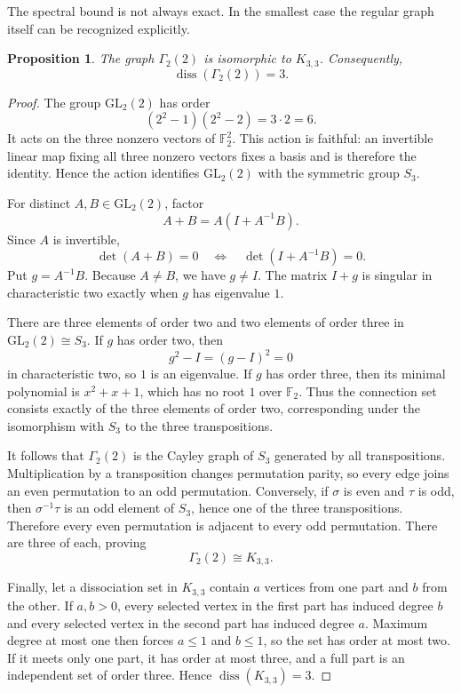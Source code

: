 \documentclass[11pt]{article}
\newtheorem{proposition}[theorem]{Proposition}
\theoremstyle{definition}
\DeclareMathOperator{\diss}{diss}
\newcommand{\F}{\mathbb{F}}
\newcommand{\GL}{\mathrm{GL}}
\begin{document}
The spectral bound is not always exact.  In the smallest case the regular
graph itself can be recognized explicitly.

\begin{proposition}\label{prop:small}
The graph $\Gamma_2(2)$ is isomorphic to $K_{3,3}$.  Consequently,
\[
  \diss(\Gamma_2(2))=3.
\]
\end{proposition}

\begin{proof}
The group $\GL_2(2)$ has order
\[
  (2^2-1)(2^2-2)=3\cdot2=6.
\]
It acts on the three nonzero vectors of $\F_2^2$.  This action is faithful:
an invertible linear map fixing all three nonzero vectors fixes a basis and
is therefore the identity.  Hence the action identifies
$\GL_2(2)$ with the symmetric group $S_3$.

For distinct $A,B\in\GL_2(2)$, factor
\[
  A+B=A(I+A^{-1}B).
\]
Since $A$ is invertible,
\[
  \det(A+B)=0
  \quad\Longleftrightarrow\quad
  \det(I+A^{-1}B)=0.
\]
Put $g=A^{-1}B$.  Because $A\ne B$, we have $g\ne I$.  The matrix $I+g$
is singular in characteristic two exactly when $g$ has eigenvalue $1$.

There are three elements of order two and two elements of order three in
$\GL_2(2)\cong S_3$.  If $g$ has order two, then
\[
  g^2-I=(g-I)^2=0
\]
in characteristic two, so $1$ is an eigenvalue.  If $g$ has order three,
then its minimal polynomial is $x^2+x+1$, which has no root $1$ over
$\F_2$.  Thus the connection set consists exactly of the three elements of
order two, corresponding under the isomorphism with $S_3$ to the three
transpositions.

It follows that $\Gamma_2(2)$ is the Cayley graph of $S_3$ generated by all
transpositions.  Multiplication by a transposition changes permutation
parity, so every edge joins an even permutation to an odd permutation.
Conversely, if $\sigma$ is even and $\tau$ is odd, then
$\sigma^{-1}\tau$ is an odd element of $S_3$, hence one of the three
transpositions.  Therefore every even permutation is adjacent to every odd
permutation.  There are three of each, proving
\[
  \Gamma_2(2)\cong K_{3,3}.
\]

Finally, let a dissociation set in $K_{3,3}$ contain $a$ vertices from one
part and $b$ from the other.  If $a,b>0$, every selected vertex in the first
part has induced degree $b$ and every selected vertex in the second part has
induced degree $a$.  Maximum degree at most one then forces $a\le1$ and
$b\le1$, so the set has order at most two.  If it meets only one part, it
has order at most three, and a full part is an independent set of order
three.  Hence $\diss(K_{3,3})=3$.
\end{proof}
\end{document}
